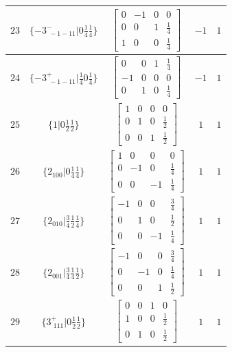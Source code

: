 \documentclass[fleqn,8pt]{jsarticle}
\begin{document}
\begin{longtable}{ccccc}
$ 23 $ & $ \{-3^{-}_{\,\,-1-11}|0 \frac{1}{4} \frac{1}{4}\} $ & $ \begin{bmatrix} 0 & -1 & 0 & 0 \\ 0 & 0 & 1 & \frac{1}{4} \\ 1 & 0 & 0 & \frac{1}{4} \end{bmatrix} $ & $ -1 $ & $ 1 $ \\ \hline
$ 24 $ & $ \{-3^{+}_{\,\,-1-11}|\frac{1}{4} 0 \frac{1}{4}\} $ & $ \begin{bmatrix} 0 & 0 & 1 & \frac{1}{4} \\ -1 & 0 & 0 & 0 \\ 0 & 1 & 0 & \frac{1}{4} \end{bmatrix} $ & $ -1 $ & $ 1 $ \\ \hline
$ 25 $ & $ \{1|0 \frac{1}{2} \frac{1}{2}\} $ & $ \begin{bmatrix} 1 & 0 & 0 & 0 \\ 0 & 1 & 0 & \frac{1}{2} \\ 0 & 0 & 1 & \frac{1}{2} \end{bmatrix} $ & $ 1 $ & $ 1 $ \\ \hline
$ 26 $ & $ \{2{}_{100}|0 \frac{1}{4} \frac{1}{4}\} $ & $ \begin{bmatrix} 1 & 0 & 0 & 0 \\ 0 & -1 & 0 & \frac{1}{4} \\ 0 & 0 & -1 & \frac{1}{4} \end{bmatrix} $ & $ 1 $ & $ 1 $ \\ \hline
$ 27 $ & $ \{2{}_{010}|\frac{3}{4} \frac{1}{2} \frac{1}{4}\} $ & $ \begin{bmatrix} -1 & 0 & 0 & \frac{3}{4} \\ 0 & 1 & 0 & \frac{1}{2} \\ 0 & 0 & -1 & \frac{1}{4} \end{bmatrix} $ & $ 1 $ & $ 1 $ \\ \hline
$ 28 $ & $ \{2{}_{001}|\frac{3}{4} \frac{1}{4} \frac{1}{2}\} $ & $ \begin{bmatrix} -1 & 0 & 0 & \frac{3}{4} \\ 0 & -1 & 0 & \frac{1}{4} \\ 0 & 0 & 1 & \frac{1}{2} \end{bmatrix} $ & $ 1 $ & $ 1 $ \\ \hline
$ 29 $ & $ \{3^{+}_{\,\,111}|0 \frac{1}{2} \frac{1}{2}\} $ & $ \begin{bmatrix} 0 & 0 & 1 & 0 \\ 1 & 0 & 0 & \frac{1}{2} \\ 0 & 1 & 0 & \frac{1}{2} \end{bmatrix} $ & $ 1 $ & $ 1 $ \\ \hline

\end{longtable}
\end{document}
